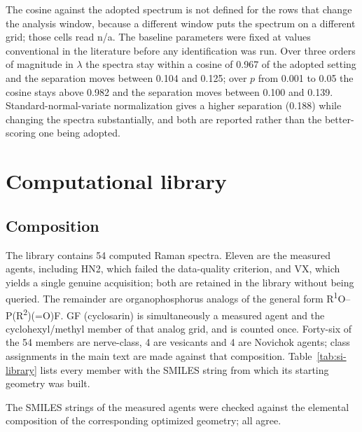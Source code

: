 \documentclass[11pt]{article}
\begin{document}
\begin{table}[htbp]
\begin{flushleft}\footnotesize The cosine against the adopted spectrum is not defined for the rows that change the analysis window, because a different window puts the spectrum on a different grid; those cells read n/a. The baseline parameters were fixed at values conventional in the literature before any identification was run. Over three orders of magnitude in $\lambda$ the spectra stay within a cosine of 0.967 of the adopted setting and the separation moves between 0.104 and 0.125; over $p$ from 0.001 to 0.05 the cosine stays above 0.982 and the separation moves between 0.100 and 0.139. Standard-normal-variate normalization gives a higher separation (0.188) while changing the spectra substantially, and both are reported rather than the better-scoring one being adopted.\end{flushleft}
\end{table}
\clearpage

\section{Computational library}
\label{si:library}

\subsection{Composition}

The library contains 54 computed Raman spectra. Eleven are the measured agents, including
HN2, which failed the data-quality criterion, and VX, which yields a single genuine
acquisition; both are retained in the library without being queried. The remainder are
organophosphorus analogs of the general form
R\textsuperscript{1}O--P(R\textsuperscript{2})(=O)F. GF (cyclosarin) is simultaneously a
measured agent and the cyclohexyl/methyl member of that analog grid, and is counted
once. Forty-six of the 54 members are nerve-class, 4 are vesicants and 4 are Novichok
agents; class assignments in the main text are made against that composition.
Table~\ref{tab:si-library} lists every member with the SMILES string from which its
starting geometry was built.

The SMILES strings of the measured agents were checked against the elemental composition
of the corresponding optimized geometry; all agree.
\end{document}
